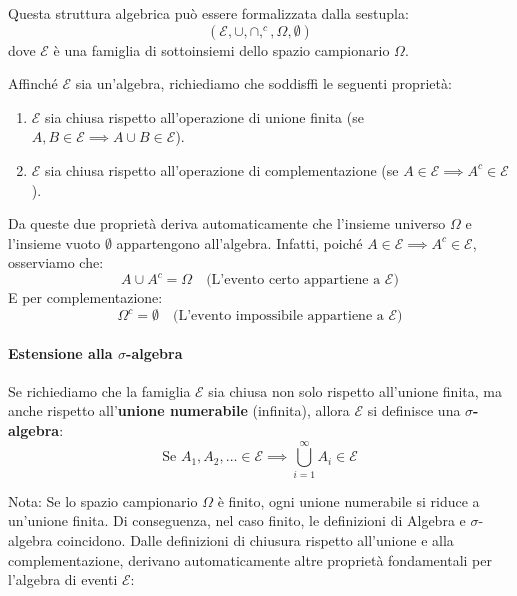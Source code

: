 Questa struttura algebrica può essere formalizzata dalla sestupla:
\[ (\mathcal{E}, \cup, \cap, ^c, \Omega, \emptyset) \]
dove $\mathcal{E}$ è una famiglia di sottoinsiemi dello spazio campionario $\Omega$.

Affinché $\mathcal{E}$ sia un'algebra, richiediamo che soddisffi le seguenti proprietà:
\begin{enumerate}
    \item $\mathcal{E}$ sia chiusa rispetto all'operazione di unione finita (se $A, B \in \mathcal{E} \implies A \cup B \in \mathcal{E}$).
    \item $\mathcal{E}$ sia chiusa rispetto all'operazione di complementazione (se $A \in \mathcal{E} \implies A^c \in \mathcal{E}$).
\end{enumerate}

Da queste due proprietà deriva automaticamente che l'insieme universo $\Omega$ e l'insieme vuoto $\emptyset$ appartengono all'algebra. Infatti, poiché $A \in \mathcal{E} \implies A^c \in \mathcal{E}$, osserviamo che:
\[ A \cup A^c = \Omega \quad \text{(L'evento certo appartiene a } \mathcal{E}) \]
E per complementazione:
\[ \Omega^c = \emptyset \quad \text{(L'evento impossibile appartiene a } \mathcal{E}) \]

\paragraph{Estensione alla $\sigma$-algebra}
Se richiediamo che la famiglia $\mathcal{E}$ sia chiusa non solo rispetto all'unione finita, ma anche rispetto all'\textbf{unione numerabile} (infinita), allora $\mathcal{E}$ si definisce una \textbf{$\sigma$-algebra}:
\[
\text{Se } A_1, A_2, \dots \in \mathcal{E} \implies \bigcup_{i=1}^{\infty} A_i \in \mathcal{E}
\]

Nota: Se lo spazio campionario $\Omega$ è finito, ogni unione numerabile si riduce a un'unione finita. Di conseguenza, nel caso finito, le definizioni di Algebra e $\sigma$-algebra coincidono.
\clearpage
Dalle definizioni di chiusura rispetto all'unione e alla complementazione, derivano automaticamente altre proprietà fondamentali per l'algebra di eventi $\mathcal{E}$:

